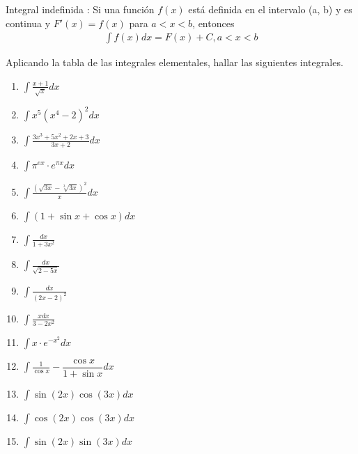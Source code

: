 Integral indefinida \cite*{analisismatematico}: Si una función $f(x)$ 
está definida en el intervalo (a, b) y es continua y $F'(x) = f(x)$ para 
$a < x < b$, entonces 
\begin{align*}
    \int f(x) dx = F(x) + C, a < x < b
\end{align*}

Aplicando la tabla de las integrales elementales,
hallar las siguientes integrales.

\begin{enumerate}
    \item $ \displaystyle \int \frac{x+1}{\sqrt{x}} dx $
    \item $ \displaystyle \int  x^5(x^4 - 2)^2dx$
    \item $ \displaystyle \int \frac{3x^3+5x^2+2x+3}{3x+2}dx$
    \item $ \displaystyle \int \pi^{ex}\cdot e^{\pi x}dx$
    \item $ \displaystyle \int \frac{(\sqrt{3x}-\sqrt[3]{3x})^2}{x} dx $
    \item $ \displaystyle \int (1 + \sin{x} + \cos{x}) dx $
    \item $ \displaystyle \int \frac{dx}{1+3x^2} $
    \item $ \displaystyle \int \frac{dx}{\sqrt{2-5x}} $
    \item $ \displaystyle \int \frac{dx}{(2x-2)^2} $
    \item $ \displaystyle \int \frac{xdx}{3-2x^2} $
    \item $ \displaystyle \int  x\cdot e^{-x^2}dx$
    \item $ \displaystyle \int  \frac{1}{\cos{x}}-\dfrac{\cos{x}}{1+\sin{x}}dx$
    \item $ \displaystyle \int  \sin(2x)\cos(3x)dx$
    \item $ \displaystyle \int  \cos(2x)\cos(3x)dx$
    \item $ \displaystyle \int  \sin(2x)\sin(3x)dx$
\end{enumerate}
